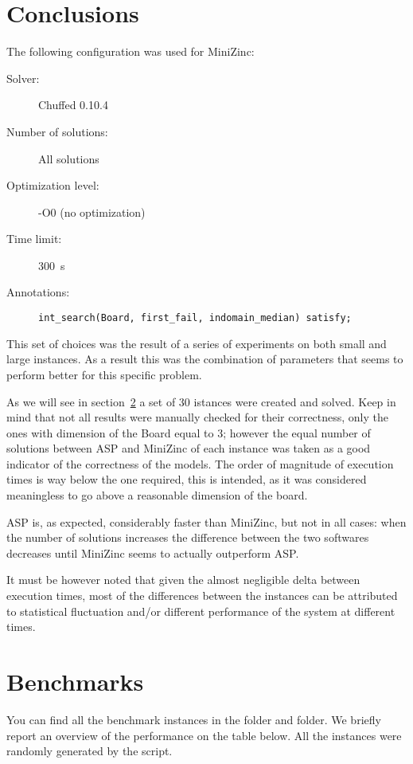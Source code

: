 \section{Conclusions}
The following configuration was used for MiniZinc:
\begin{description}
    \item[Solver: ] Chuffed 0.10.4
    \item[Number of solutions: ] All solutions
    \item[Optimization level: ] -O0 (no optimization)
    \item[Time limit: ] \SI{300}{s}
    \item[Annotations: ] \texttt{int_search(Board, first_fail, indomain_median) satisfy;}
\end{description}

This set of choices was the result of a series of experiments on both small and large instances. As a result this was the combination of parameters that seems to perform better for this specific problem.


As we will see in section~\ref{sec:benchmarks} a set of 30 istances were created and solved. Keep in mind that not all results were manually checked for their correctness, only the ones with dimension of the Board equal to 3; however the equal number of solutions between ASP and MiniZinc of each instance was taken as a good indicator of the correctness of the models.
The order of magnitude of execution times is way below the one required, this is intended, as it was considered meaningless to go above a reasonable dimension of the board.

ASP is, as expected, considerably faster than MiniZinc, but not in all cases: when the number of solutions increases the difference between the two softwares decreases until MiniZinc seems to actually outperform ASP. 

It must be however noted that given the almost negligible delta between execution times, most of the differences between the instances can be attributed to statistical fluctuation and/or different performance of the system at different times.

\section{Benchmarks}\label{sec:benchmarks}
You can find all the benchmark instances in the  folder and  folder. We briefly report an overview of the performance on the table below. All the instances were randomly generated by the script.



